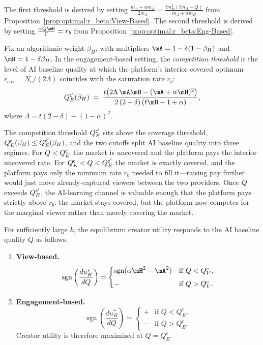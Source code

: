 \medskip
The first threshold is derived by setting $\frac{m_A + \alpha m_H}{2m_A}= \frac{t m_H^2 (t m_A - Q)}{m_A + \alpha m_H}$ from Proposition~\ref{prop:optimal:r_beta:View-Based}.
The second threshold is derived by setting $\frac{\alpha Q \mH}{\Gamma}=r_b$ from Proposition \ref{prop:optimal:r_beta:Eng-Based}.

\begin{definition}\label{def:competition}
Fix an algorithmic weight $\beta_H$, with multipliers $\mA=1-\delta(1-\beta_H)$ and
$\mH=1-\delta\beta_H$. In the engagement-based setting, the \emph{competition
threshold} is the level of AI baseline quality at which the platform's interior
covered optimum $r_{\mathrm{cov}}=N_c/(2\Lambda)$ coincides with the saturation
rate $r_b$:
\[
    Q_E^{\sf c'}(\beta_H)
    \;=\;
    \frac{t\bigl(2\Lambda\,\mA\mH - (\mA+\alpha\mH)^{2}\bigr)}{2\,(2-\delta)\,(t\mH-1+\alpha)},
\]
where $\Lambda=t(2-\delta)-(1-\alpha)^{2}$.
\end{definition}
The competition threshold $Q_E^{\sf c'}$ sits above the coverage threshold,
$Q_E^{\sf c}(\beta_H)\le Q_E^{\sf c'}(\beta_H)$, and the two cutoffs split
AI baseline quality into three regimes. For $Q<Q_E^{\sf c}$ the market is
uncovered and the platform pays the interior uncovered rate. For
$Q_E^{\sf c}<Q<Q_E^{\sf c'}$ the market is exactly covered, and the platform pays
only the minimum rate $r_b$ needed to fill it---raising pay further would just
move already-captured viewers between the two providers. Once $Q$ exceeds
$Q_E^{\sf c'}$, the AI-learning channel is valuable enough that the platform
pays strictly above $r_b$: the market stays covered, but the platform now competes
for the marginal viewer rather than merely covering the market.



\begin{corollary}\label{cor:Q_uh}
For sufficiently large $k$, the equilibrium creator utility
responds to the AI baseline quality $Q$ as follows.

\begin{enumerate}
    \item \textbf{View-based.}
    \[
    \operatorname{sgn}\left(\frac{du_H^*}{dQ}\right)=
    \begin{cases}
    \operatorname{sgn}(\alpha\mH^2-\mA^2) & \text{if } Q<Q^{c}_{V},\\[4pt]
    - & \text{if } Q> Q^{c}_{V}.
    \end{cases}
    \]
    \item \textbf{Engagement-based.} 
    \[
    \operatorname{sgn}\left(\frac{du_H^*}{dQ}\right)=
    \begin{cases}
    + & \text{if } Q<Q^{c}_{E},\\[4pt]
    - & \text{if } Q> Q^{c}_{E}.
    \end{cases}
    \]
    Creator utility is therefore maximized at
    $Q=Q^{c}_E$.
\end{enumerate}
\end{corollary}


